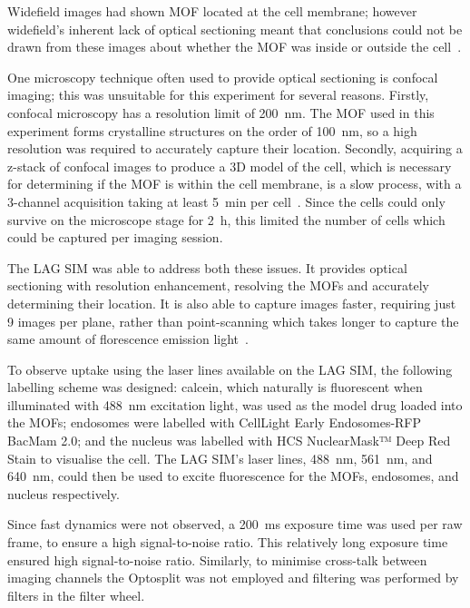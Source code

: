 Widefield images had shown MOF located at the cell membrane; however widefield's inherent lack of optical sectioning meant that conclusions could not be drawn from these images about whether the MOF was inside or outside the cell~\cite{orellana2015amorphous}.

One microscopy technique often used to provide optical sectioning is confocal imaging; this was unsuitable for this experiment for several reasons. 
Firstly, confocal microscopy has a resolution limit of \SI{200}{\nano\metre}.
The MOF used in this experiment forms crystalline structures on the order of \SI{100}{\nano\metre}, so a high resolution was required to accurately capture their location. 
Secondly, acquiring a z-stack of confocal images to produce a 3D model of the cell, which is necessary for determining if the MOF is within the cell membrane, is a slow process, with a 3-channel acquisition taking at least \SI{5}{\minute} per cell~\cite{jonkman2015any}.
Since the cells could only survive on the microscope stage for \SI{2}{\hour}, this limited the number of cells which could be captured per imaging session.

The LAG SIM was able to address both these issues. 
It provides optical sectioning with resolution enhancement, resolving the MOFs and accurately determining their location. 
It is also able to capture images faster, requiring just 9 images per plane, rather than point-scanning which takes longer to capture the same amount of florescence emission light~\cite{jonkman2015any}. 

To observe uptake using the laser lines available on the LAG SIM, the following labelling scheme was designed:
calcein, which naturally is fluorescent when illuminated with \SI{488}{\nano\metre} excitation light, was used as the model drug loaded into the MOFs; 
endosomes were labelled with CellLight Early Endosomes-RFP BacMam 2.0; and the nucleus was labelled with HCS NuclearMask™ Deep Red Stain to visualise the cell. 
The LAG SIM's laser lines, \SI{488}{\nano\metre}, \SI{561}{\nano\metre}, and \SI{640}{\nano\metre}, could then be used to excite fluorescence for the MOFs, endosomes, and nucleus respectively. 

Since fast dynamics were not observed, a \SI{200}{\milli\second} exposure time was used per raw frame, to ensure a high signal-to-noise ratio. 
This relatively long exposure time ensured high signal-to-noise ratio.
Similarly, to minimise cross-talk between imaging channels the Optosplit was not employed and filtering was performed by filters in the filter wheel. 

